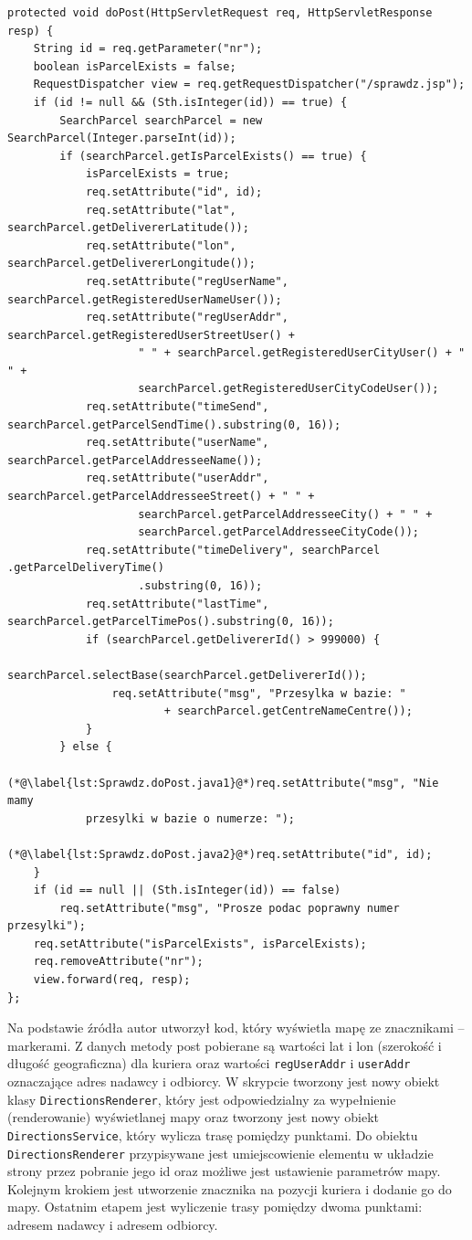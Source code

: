 \documentclass[eng,printmode,oneside]{mgr}
\begin{document}
\begin{lstlisting}[caption=Fragment klasy Sprawdz.Java\,
metoda doPost(),label=lst:Sprawdz.doPost.java]
protected void doPost(HttpServletRequest req, HttpServletResponse resp) {
	String id = req.getParameter("nr");
	boolean isParcelExists = false;
	RequestDispatcher view = req.getRequestDispatcher("/sprawdz.jsp");
	if (id != null && (Sth.isInteger(id)) == true) {
		SearchParcel searchParcel = new SearchParcel(Integer.parseInt(id));
		if (searchParcel.getIsParcelExists() == true) {
			isParcelExists = true;
			req.setAttribute("id", id);
			req.setAttribute("lat", searchParcel.getDelivererLatitude());
			req.setAttribute("lon", searchParcel.getDelivererLongitude());
			req.setAttribute("regUserName",	searchParcel.getRegisteredUserNameUser());
			req.setAttribute("regUserAddr",	searchParcel.getRegisteredUserStreetUser() +
					" " + searchParcel.getRegisteredUserCityUser() + " " +
					searchParcel.getRegisteredUserCityCodeUser()); 
			req.setAttribute("timeSend", searchParcel.getParcelSendTime().substring(0, 16));
			req.setAttribute("userName", searchParcel.getParcelAddresseeName());
			req.setAttribute("userAddr", searchParcel.getParcelAddresseeStreet() + " " +
					searchParcel.getParcelAddresseeCity() + " "	+ 
					searchParcel.getParcelAddresseeCityCode());
			req.setAttribute("timeDelivery", searchParcel .getParcelDeliveryTime()
					.substring(0, 16)); 
			req.setAttribute("lastTime", searchParcel.getParcelTimePos().substring(0, 16));
			if (searchParcel.getDelivererId() > 999000) {
				searchParcel.selectBase(searchParcel.getDelivererId());
				req.setAttribute("msg", "Przesylka w bazie: "
						+ searchParcel.getCentreNameCentre());
			}
		} else {
			(*@\label{lst:Sprawdz.doPost.java1}@*)req.setAttribute("msg", "Nie mamy
			przesylki w bazie o numerze: ");
			(*@\label{lst:Sprawdz.doPost.java2}@*)req.setAttribute("id", id); 
	}
	if (id == null || (Sth.isInteger(id)) == false)
		req.setAttribute("msg", "Prosze podac poprawny numer przesylki"); 
	req.setAttribute("isParcelExists", isParcelExists);
	req.removeAttribute("nr");
	view.forward(req, resp);
};
\end{lstlisting}

Na podstawie źródła \cite{developer.google.maps} autor utworzył kod,
który wyświetla mapę ze znacznikami -- markerami. Z danych metody post pobierane
są wartości lat i lon (szerokość i długość geograficzna) dla kuriera oraz wartości
\texttt{regUserAddr} i \texttt{userAddr} oznaczające adres nadawcy i odbiorcy. W
skrypcie tworzony jest nowy obiekt klasy \texttt{DirectionsRenderer}, który jest
odpowiedzialny za wypełnienie (renderowanie) wyświetlanej mapy oraz tworzony
jest nowy obiekt \texttt{DirectionsService}, który wylicza trasę pomiędzy punktami.
Do obiektu \texttt{DirectionsRenderer} przypisywane jest umiejscowienie elementu
w układzie strony przez pobranie jego id oraz możliwe jest ustawienie parametrów mapy.
Kolejnym krokiem jest utworzenie znacznika na pozycji kuriera i dodanie go do
mapy. Ostatnim etapem jest wyliczenie trasy pomiędzy dwoma punktami: adresem
nadawcy i adresem odbiorcy.
\end{document}

